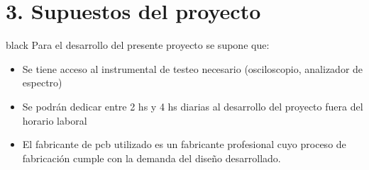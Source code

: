 \documentclass[11pt]{charter}
\begin{document}
\section{3. Supuestos del proyecto}
\label{sec:supuestos}

\begin{consigna}{black}
Para el desarrollo del presente proyecto se supone que:

\begin{itemize}
\item Se tiene acceso al instrumental de testeo necesario (osciloscopio, analizador de espectro)
\item Se podrán dedicar entre 2 hs y 4 hs diarias al desarrollo del proyecto fuera del horario laboral
\item El fabricante de pcb utilizado es un fabricante profesional cuyo proceso de fabricación
cumple con la demanda del diseño desarrollado.
\end{itemize}
\end{consigna}
\end{document}
